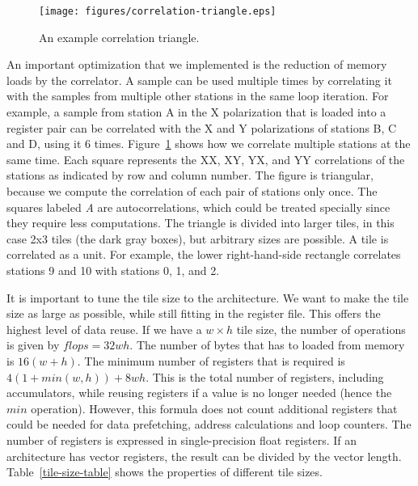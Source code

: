 \documentclass{article}
\begin{document}
\begin{figure}[t]
\begin{center}
\texttt{[image: figures/correlation-triangle.eps]}
\end{center}
\vspace{-0.5cm}
\caption{An example correlation triangle.}
\label{fig-correlation}
\end{figure}

An important optimization that we implemented is the reduction
of memory loads by the correlator. 
A sample can be used multiple times by correlating it
with the samples from multiple other stations in the same loop iteration.
For example, a sample from station A in the X polarization
that is loaded into a register pair can be correlated with the X and
Y polarizations of stations B, C and D, using it 6 times. 
Figure~\ref{fig-correlation} shows how we correlate multiple
stations at the same time. Each square represents the XX, XY,
YX, and YY correlations of the stations as indicated by row and
column number. The figure is triangular, because we compute
the correlation of each pair of stations only once. The squares labeled \emph{A} are
autocorrelations, which could be treated specially since they require less
computations. The triangle is divided into larger tiles, in this case 
2x3 tiles (the dark gray boxes), but arbitrary sizes are possible.
A tile is correlated as a unit. For example, the lower
right-hand-side rectangle correlates stations 9 and 10 with stations
0, 1, and 2.

It is important to tune the tile size to the architecture. We want to
make the tile size as large as possible, while still fitting in the
register file. This offers the highest level of data reuse.  
If we have a $w \times h$ tile size, the number of operations is given by $flops = 32wh$.
The number of bytes that has to loaded from memory is $16(w+h)$.
The minimum number of registers that is required is $4 (1 + min(w,h)) + 8 w h$.
This is the total number of registers, including accumulators, while reusing
registers if a value is no longer needed (hence the $min$ operation). However,
this formula does not count additional registers that could be needed for data prefetching,
address calculations and loop counters.
The number of registers is expressed in single-precision float registers. If an architecture has vector
registers, the result can be divided by the vector length.
Table~\ref{tile-size-table} shows the properties of different tile sizes. 
\end{document}
